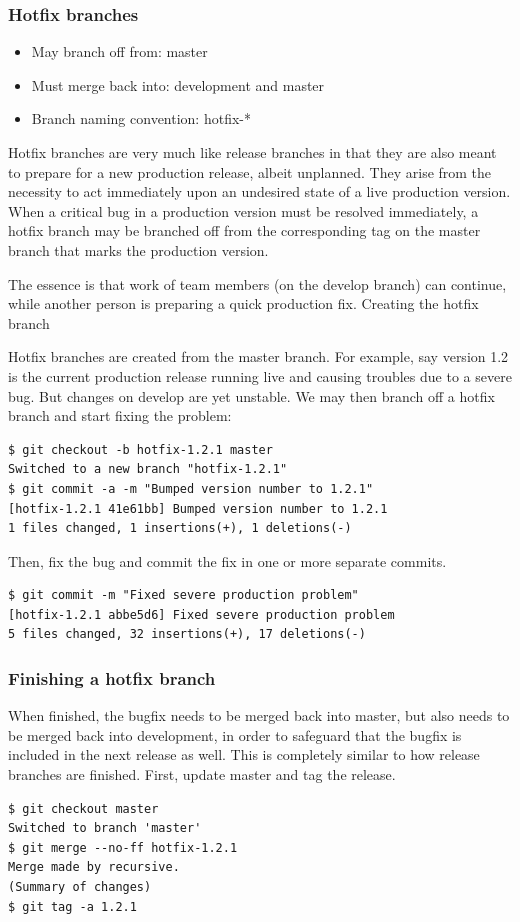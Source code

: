 \subsubsection{Hotfix branches}
\begin{itemize}[itemsep=1pt, parsep=1pt]
  \item May branch off from: master
  \item Must merge back into: development and master
  \item Branch naming convention: hotfix-* 
\end{itemize}

Hotfix branches are very much like release branches in that they are also meant
to prepare for a new production release, albeit unplanned. They arise from the
necessity to act immediately upon an undesired state of a live production
version. When a critical bug in a production version must be resolved
immediately, a hotfix branch may be branched off from the corresponding tag on
the master branch that marks the production version.

The essence is that work of team members (on the develop branch) can continue,
while another person is preparing a quick production fix. Creating the hotfix
branch

Hotfix branches are created from the master branch. For example, say version 1.2
is the current production release running live and causing troubles due to a
severe bug. But changes on develop are yet unstable. We may then branch off a
hotfix branch and start fixing the problem:
\begin{verbatim}
$ git checkout -b hotfix-1.2.1 master
Switched to a new branch "hotfix-1.2.1"
$ git commit -a -m "Bumped version number to 1.2.1"
[hotfix-1.2.1 41e61bb] Bumped version number to 1.2.1
1 files changed, 1 insertions(+), 1 deletions(-)
\end{verbatim}
Then, fix the bug and commit the fix in one or more separate commits.
\begin{verbatim}
$ git commit -m "Fixed severe production problem"
[hotfix-1.2.1 abbe5d6] Fixed severe production problem
5 files changed, 32 insertions(+), 17 deletions(-)
\end{verbatim}

\subsubsection{Finishing a hotfix branch}

When finished, the bugfix needs to be merged back into master, but also needs to
be merged back into development, in order to safeguard that the bugfix is
included in the next release as well. This is completely similar to how release
branches are finished. First, update master and tag the release.
\begin{verbatim}
$ git checkout master
Switched to branch 'master'
$ git merge --no-ff hotfix-1.2.1
Merge made by recursive.
(Summary of changes)
$ git tag -a 1.2.1
\end{verbatim}

